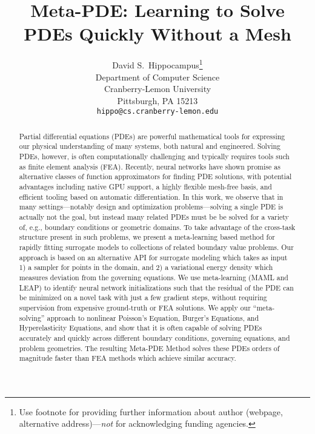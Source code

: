 \documentclass{article}
\title{Meta-PDE: Learning to Solve PDEs Quickly Without a Mesh}
\author{%
  David S.~Hippocampus\thanks{Use footnote for providing further information
    about author (webpage, alternative address)---\emph{not} for acknowledging
    funding agencies.} \\
  Department of Computer Science\\
  Cranberry-Lemon University\\
  Pittsburgh, PA 15213 \\
  \texttt{hippo@cs.cranberry-lemon.edu} \\
}
\begin{document}
\maketitle

\begin{abstract}
Partial differential equations (PDEs) are powerful mathematical tools for expressing our physical understanding of many systems, both natural and engineered.
Solving PDEs, however, is often computationally challenging and typically requires tools such as finite element analysis (FEA).
Recently, neural networks have shown promise as alternative classes of function approximators for finding PDE solutions, with potential advantages including native GPU support, a highly flexible mesh-free basis, and efficient tooling based on automatic differentiation.
In this work, we observe that in many settings---notably design and optimization problems---solving a single PDE is actually not the goal, but instead many related PDEs must be be solved for a variety of, e.g., boundary conditions or geometric domains.
To take advantage of the cross-task structure present in such problems, we present a meta-learning based method for rapidly fitting surrogate models to collections of related boundary value problems.
Our approach is based on an alternative API for surrogate modeling which takes as input 1) a sampler for points in the domain, and 2) a variational energy density which measures deviation from the governing equations.
We use meta-learning (MAML and LEAP) to identify neural network initializations such that the residual of the PDE can be minimized on a novel task with just a few gradient steps, without requiring supervision from expensive ground-truth or FEA solutions.
We apply our ``meta-solving'' approach to nonlinear Poisson's Equation, Burger's Equations, and Hyperelasticity Equations, and show that it is often capable of solving PDEs accurately and quickly across different boundary conditions, governing equations, and problem geometries.
The resulting Meta-PDE Method solves these PDEs orders of magnitude faster than FEA methods which achieve similar accuracy.
\end{abstract}

%
%
%







\end{document}
